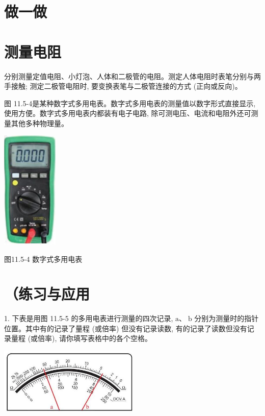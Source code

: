 \documentclass[10pt]{article}
\begin{document}
\section*{做一做}

\section*{测量电阻}

分别测量定值电阻、小灯泡、人体和二极管的电阻。测定人体电阻时表笔分别与两手接触; 测定二极管电阻时, 要变换表笔与二极管连接的方式 (正向或反向)。

图 11.5-4是某种数字式多用电表。数字式多用电表的测量值以数字形式直接显示, 使用方便。数字式多用电表内都装有电子电路, 除可测电压、电流和电阻外还可测量其他多种物理量。

\begin{center}
\includegraphics[max width=0.2\textwidth]{images/01911d5f-8e38-70c0-b5b8-2b399bd115b6_78_319559.jpg}
\end{center}

图11.5-4 数字式多用电表

\section*{（练习与应用}

1. 下表是用图 11.5-5 的多用电表进行测量的四次记录, \(\mathrm{a}\text{、}\mathrm{\;b}\) 分别为测量时的指针位置。其中有的记录了量程 (或倍率) 但没有记录读数, 有的记录了读数但没有记录量程 (或倍率), 请你填写表格中的各个空格。

\begin{center}
\includegraphics[max width=0.5\textwidth]{images/01911d5f-8e38-70c0-b5b8-2b399bd115b6_79_949950.jpg}
\end{center}
\end{document}
